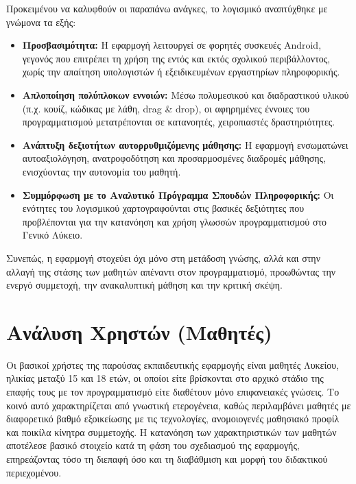 \documentclass[11pt]{report}
\begin{document}
Προκειμένου να καλυφθούν οι παραπάνω ανάγκες, το λογισμικό αναπτύχθηκε με γνώμονα τα εξής:

\begin{itemize}
    \item \textbf{Προσβασιμότητα:} Η εφαρμογή λειτουργεί σε φορητές συσκευές Android, γεγονός που επιτρέπει τη χρήση της εντός και εκτός σχολικού περιβάλλοντος, χωρίς την απαίτηση υπολογιστών ή εξειδικευμένων εργαστηρίων πληροφορικής.
    
    \item \textbf{Απλοποίηση πολύπλοκων εννοιών:} Μέσω πολυμεσικού και διαδραστικού υλικού (π.χ. κουίζ, κώδικας με λάθη, drag \& drop), οι αφηρημένες έννοιες του προγραμματισμού μετατρέπονται σε κατανοητές, χειροπιαστές δραστηριότητες.
    
    \item \textbf{Ανάπτυξη δεξιοτήτων αυτορρυθμιζόμενης μάθησης:} Η εφαρμογή ενσωματώνει αυτοαξιολόγηση, ανατροφοδότηση και προσαρμοσμένες διαδρομές μάθησης, ενισχύοντας την αυτονομία του μαθητή.
    
    \item \textbf{Συμμόρφωση με το Αναλυτικό Πρόγραμμα Σπουδών Πληροφορικής:} Οι ενότητες του λογισμικού χαρτογραφούνται στις βασικές δεξιότητες που προβλέπονται για την κατανόηση και χρήση γλωσσών προγραμματισμού στο Γενικό Λύκειο.
\end{itemize}

Συνεπώς, η εφαρμογή στοχεύει όχι μόνο στη μετάδοση γνώσης, αλλά και στην αλλαγή της στάσης των μαθητών απέναντι στον προγραμματισμό, προωθώντας την ενεργό συμμετοχή, την ανακαλυπτική μάθηση και την κριτική σκέψη.

\section{Ανάλυση Χρηστών (Μαθητές)}

Οι βασικοί χρήστες της παρούσας εκπαιδευτικής εφαρμογής είναι μαθητές Λυκείου, ηλικίας μεταξύ 15 και 18 ετών, οι οποίοι είτε βρίσκονται στο αρχικό στάδιο της επαφής τους με τον προγραμματισμό είτε διαθέτουν μόνο επιφανειακές γνώσεις. Το κοινό αυτό χαρακτηρίζεται από γνωστική ετερογένεια, καθώς περιλαμβάνει μαθητές με διαφορετικό βαθμό εξοικείωσης με τις τεχνολογίες, ανομοιογενές μαθησιακό προφίλ και ποικίλα κίνητρα συμμετοχής. Η κατανόηση των χαρακτηριστικών των μαθητών αποτέλεσε βασικό στοιχείο κατά τη φάση του σχεδιασμού της εφαρμογής, επηρεάζοντας τόσο τη διεπαφή όσο και τη διαβάθμιση και μορφή του διδακτικού περιεχομένου. 
\end{document}
